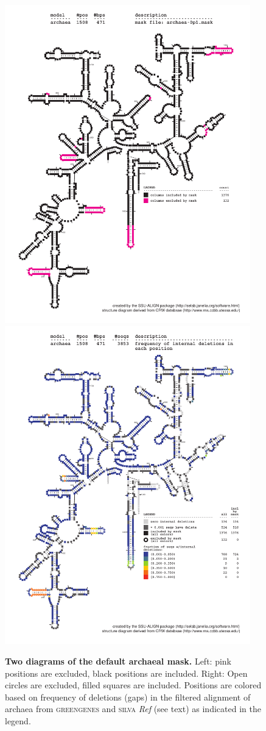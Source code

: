 \begin{figure}
  \begin{center}
\includegraphics[width=4.2in]{Figures/archaea-0p1-mask}
\includegraphics[width=4.2in]{Figures/archaea-ggsilR-dint-wmask}
  \end{center}
\caption{\textbf{Two diagrams of the default archaeal mask.} Left: pink positions are excluded,
  black positions are included. Right: Open circles are excluded,
  filled squares are included. Positions are colored based on
  frequency of deletions (gaps) in the filtered alignment of archaea
  from \textsc{greengenes} and \textsc{silva} \emph{Ref} (see text) as
  indicated in the legend.}
\label{fig:mask-arc}
\end{figure}

